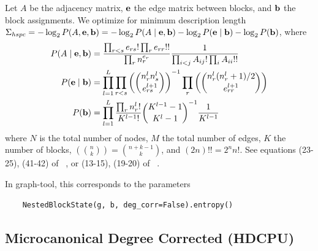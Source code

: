 \documentclass[aps,pre,superscriptaddress]{revtex4}
\begin{document}
Let $A$ be the adjacency matrix, $\vb{e}$ the edge matrix between blocks, and $\vb{b}$ the block assignments.
We optimize for minimum description length $\Sigma_{hspc} = -\log_2P(A, \vb{e}, \vb{b}) = -\log_2 P(A \mid \vb{e}, \vb{b}) - \log_2 P(\vb{e} \mid \vb{b}) - \log_2 P(\vb{b})$, where
\begin{align}
	P(A \mid \vb{e}, \vb{b}) & = \frac{\prod_{r < s} e_{rs}! \prod_{r} e_{rr}!!}{\prod_r n_r^{e_r}} \frac{1}{\prod_{i < j} A_{ij}! \prod_{i} A_{ii}!!}                                    \\
	P(\vb{e} \mid \vb{b})    & = \prod_{l=1}^{L} \prod_{r < s} \left( \binom{n_r^l n_s^l}{e_{rs}^{l+1}} \right)^{-1} \prod_r \left( \binom{ n_r^l (n_r^l + 1) / 2 }{e_{rr}^{l+1} }\right) \\
	P(\vb{b})                & = \prod_{l=1}^L \frac{\prod_r n_r^l!}{K^{l-1}!} \binom{ K^{l-1} - 1}{K^l - 1}^{-1} \frac{1}{K^{l-1}}
\end{align}
where $N$ is the total number of nodes, $M$ the total number of edges, $K$ the number of blocks, $\left( \binom{n}{k} \right) = \binom{n + k - 1}{k}$, and $(2n)!! = 2^n n!$.
See equations (23-25), (41-42) of ~\cite{peixoto17-01}, or (13-15), (19-20) of ~\cite{funke19-04}.

In graph-tool, this corresponds to the parameters
\begin{verbatim}
    NestedBlockState(g, b, deg_corr=False).entropy()
\end{verbatim}

\subsection*{Microcanonical Degree Corrected (HDCPU)}
\end{document}
